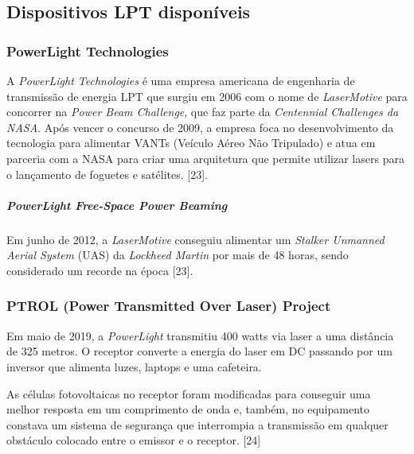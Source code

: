 \subsection{Dispositivos LPT disponíveis}

\subsubsection{PowerLight Technologies}

A \emph{PowerLight Technologies} é uma empresa americana de engenharia de transmissão de energia LPT que surgiu em 2006 com o nome de \emph{LaserMotive} para concorrer na \emph{Power Beam Challenge}, que faz parte da \emph{Centennial Challenges da NASA}. Após vencer o concurso de 2009, a empresa foca no desenvolvimento da tecnologia para alimentar VANTs (Veículo Aéreo Não Tripulado) e atua em parceria com a NASA para criar uma arquitetura que permite utilizar lasers para o lançamento de foguetes e satélites. [23].

\subparagraph{PowerLight Free-Space Power Beaming}

Em junho de 2012, a \emph{LaserMotive} conseguiu alimentar um \emph{Stalker Unmanned Aerial System} (UAS) da \emph{Lockheed Martin} por mais de 48 horas, sendo considerado um recorde na época [23].

\subsubsection{PTROL (Power Transmitted Over Laser) Project}

Em maio de 2019, a \emph{PowerLight} transmitiu 400 watts via laser a uma distância de 325 metros. O receptor converte a energia do laser em DC passando por um inversor que alimenta luzes, laptops e uma cafeteira.

As células fotovoltaicas no receptor foram modificadas para conseguir uma melhor resposta em um comprimento de onda e, também, no equipamento constava um sistema de segurança que interrompia a transmissão em qualquer obstáculo colocado entre o emissor e o receptor. [24]